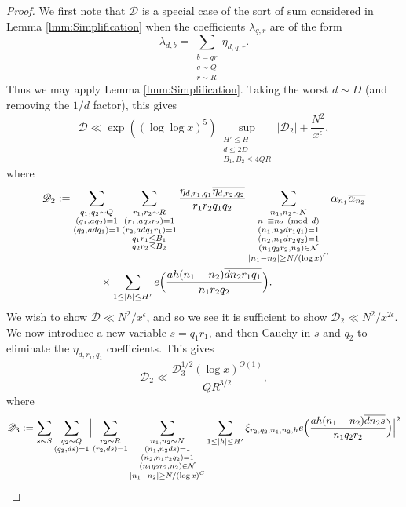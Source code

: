 \documentclass[10pt]{amsart}
\theoremstyle{plain}
\numberwithin{equation}{section}
\newcommand{\Mod}[1]{\ (\mathrm{mod}\ #1)}
\begin{document}
\begin{proof}
We first note that $\mathscr{D}$ is a special case of the sort of sum considered in Lemma \ref{lmm:Simplification} when the coefficients $\lambda_{q,r}$ are of the form
\[
\lambda_{d,b}=\sum_{\substack{b=qr\\ q\sim Q\\ r\sim R}}\eta_{d,q,r}.
\]
Thus we may apply Lemma \ref{lmm:Simplification}. Taking the worst $d\sim D$ (and removing the $1/d$ factor), this gives
\[
\mathscr{D}\ll \exp((\log\log{x})^5)\sup_{\substack{H'\le H\\ d\le 2D\\ B_1,B_2\le 4QR}}|\mathscr{D}_2|+\frac{N^2}{x^\epsilon},
\]
where 
\begin{align*}
\mathscr{D}_2&:=\sum_{\substack{q_1,q_2\sim Q\\ (q_1,a q_2)=1\\ (q_2,a d q_1)=1}}\sum_{\substack{r_1,r_2\sim R\\ (r_1,a q_2 r_2)=1\\ (r_2,a d q_1 r_1)=1\\ q_1r_1\le B_1\\ q_2r_2\le B_2}}\frac{\eta_{d,r_1,q_1}\overline{\eta_{d,r_2,q_2}}}{r_1r_2q_1q_2}\sum_{\substack{n_1,n_2\sim N \\ n_1\equiv n_2\Mod{d}\\ (n_1,n_2 d r_1 q_1)=1\\ (n_2,n_1 d r_2 q_2)=1\\ (n_1 q_2r_2,n_2)\in\mathcal{N} \\ |n_1-n_2|\ge N/(\log{x})^C}}\alpha_{n_1}\overline{\alpha_{n_2}}\\
&\qquad\qquad \times\sum_{1\le |h| \le H'} e\Bigl(\frac{ah(n_1-n_2)\overline{d n_2 r_1q_1}}{ n_1 r_2 q_2}\Bigr).
\end{align*}
We wish to show $\mathscr{D}\ll N^2/x^\epsilon$, and so we see it is sufficient to show $\mathscr{D}_2\ll N^2/x^{2\epsilon}$. We now introduce a new variable $s=q_1r_1$, and then Cauchy in $s$ and $q_2$ to eliminate the $\eta_{d,r_1,q_1}$ coefficients. This gives
\[
\mathscr{D}_2\ll \frac{\mathscr{D}_3^{1/2}(\log{x})^{O(1)}}{Q R^{3/2}},
\]
where
\begin{align*}
\mathscr{D}_3&:=\sum_{s\sim S}\sum_{\substack{q_2\sim Q\\ (q_2,d s)=1}}\Bigl|\sum_{\substack{r_2\sim R\\ (r_2,ds)=1}}\sum_{\substack{n_1,n_2\sim N\\  (n_1,n_2 d s)=1\\ (n_2,n_1r_2q_2)=1\\ (n_1q_2r_2,n_2)\in\mathcal{N}\\ |n_1-n_2|\ge N/(\log{x})^C}}\sum_{1\le |h| \le H'}\xi_{r_2,q_2,n_1,n_2,h}e\Bigl(\frac{ah(n_1-n_2)\overline{d n_2 s}}{ n_1 q_2 r_2}\Bigr)\Bigr|^2\\

\end{align*}
\end{proof}
\end{document}
